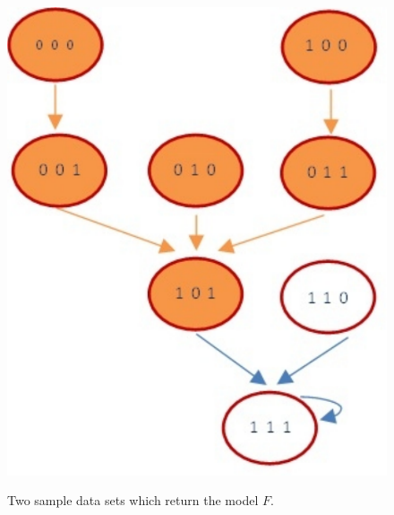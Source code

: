 \documentclass{amsart}
\theoremstyle{definition}
\theoremstyle{remark}
\theoremstyle{example}
\theoremstyle{conjecture}
\numberwithin{equation}{section}
\begin{document}
\begin{figure}
  \centering
  	\includegraphics[scale=0.3]{data1.pdf}\\
  \caption{Two sample data sets which return the model $F$.}\label{}
\end{figure}
\end{document}
